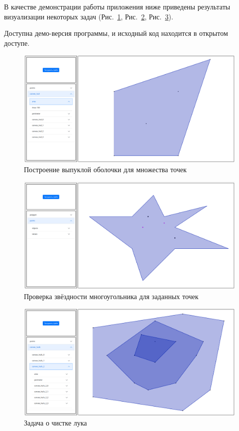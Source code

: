 \documentclass[12pt]{article}
\begin{document}
В качестве демонстрации работы приложения ниже приведены результаты визуализации некоторых задач (Рис.~\ref{fig:1}, Рис.~\ref{fig:2}, Рис.~\ref{fig:3}).

Доступна демо-версия программы\cite{b2}, и исходный код находится в открытом доступе\cite{b3}. 

\begin{figure}[ht!]
	\centering
	\includegraphics[width=.8\linewidth]{3.png}
	\caption{Построение выпуклой оболочки для множества точек}
	\label{fig:1}
\end{figure}

\begin{figure}[ht!]
	\centering
	\includegraphics[width=.8\linewidth]{9.png}
	\caption{Проверка звёздности многоугольника для заданных точек}
	\label{fig:2}
\end{figure}

\begin{figure}[ht!]
	\centering
	\includegraphics[width=.8\linewidth]{16.png}
	\caption{Задача о чистке лука}
	\label{fig:3}
\end{figure}
\end{document}
